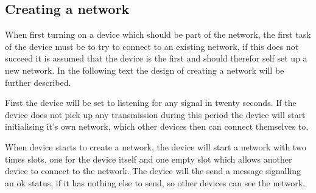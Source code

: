 \subsection{Creating a network}
When first turning on a device which should be part of the network, the first task of the device must be to try to connect to an existing network, if this does not succeed it is assumed that the device is the first and should therefor self set up a new network.
In the following text the design of creating a network will be further described.

First the device will be set to listening for any signal in twenty seconds. 
If the device does not pick up any transmission during this period the device will start initialising it's own network, which other devices then can connect themselves to.

When device starts to create a network, the device will start a network with two times slots, one for the device itself and one empty slot which allows another device to connect to the network.
The device will the send a message signalling an ok status, if it has nothing else to send, so other devices can see the network.   